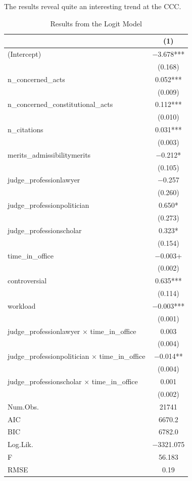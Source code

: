 \documentclass[
  11pt,
]{article}
\begin{document}
The results reveal quite an interesting trend at the CCC.

\begin{table}

\caption{\label{tab:unnamed-chunk-6}Results from the Logit Model}
\centering
\begin{tabular}[t]{lc}
\toprule
  & (1)\\
\midrule
(Intercept) & \num{-3.678}***\\
 & (\num{0.168})\\
n\_concerned\_acts & \num{0.052}***\\
 & (\num{0.009})\\
n\_concerned\_constitutional\_acts & \num{0.112}***\\
 & (\num{0.010})\\
n\_citations & \num{0.031}***\\
 & (\num{0.003})\\
merits\_admissibilitymerits & \num{-0.212}*\\
 & (\num{0.105})\\
judge\_professionlawyer & \num{-0.257}\\
 & (\num{0.260})\\
judge\_professionpolitician & \num{0.650}*\\
 & (\num{0.273})\\
judge\_professionscholar & \num{0.323}*\\
 & (\num{0.154})\\
time\_in\_office & \num{-0.003}+\\
 & \vphantom{1} (\num{0.002})\\
controversial & \num{0.635}***\\
 & (\num{0.114})\\
workload & \num{-0.003}***\\
 & (\num{0.001})\\
judge\_professionlawyer × time\_in\_office & \num{0.003}\\
 & \vphantom{1} (\num{0.004})\\
judge\_professionpolitician × time\_in\_office & \num{-0.014}**\\
 & (\num{0.004})\\
judge\_professionscholar × time\_in\_office & \num{0.001}\\
 & (\num{0.002})\\
\midrule
Num.Obs. & \num{21741}\\
AIC & \num{6670.2}\\
BIC & \num{6782.0}\\
Log.Lik. & \num{-3321.075}\\
F & \num{56.183}\\
RMSE & \num{0.19}\\
\bottomrule
\end{tabular}
\end{table}
\end{document}
